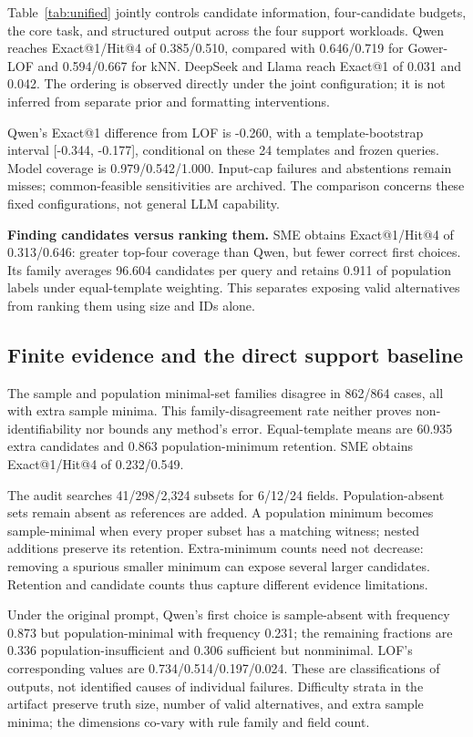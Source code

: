 \documentclass[conference]{IEEEtran}
\begin{document}
Table~\ref{tab:unified} jointly controls candidate information, four-candidate budgets, the core task, and structured output across the four support workloads. Qwen reaches Exact@1/Hit@4 of 0.385/0.510, compared with 0.646/0.719 for Gower-LOF and 0.594/0.667 for kNN. DeepSeek and Llama reach Exact@1 of 0.031 and 0.042. The ordering is observed directly under the joint configuration; it is not inferred from separate prior and formatting interventions.

Qwen's Exact@1 difference from LOF is -0.260, with a template-bootstrap interval [-0.344, -0.177], conditional on these 24 templates and frozen queries. Model coverage is 0.979/0.542/1.000. Input-cap failures and abstentions remain misses; common-feasible sensitivities are archived. The comparison concerns these fixed configurations, not general LLM capability.

\textbf{Finding candidates versus ranking them.} SME obtains Exact@1/Hit@4 of 0.313/0.646: greater top-four coverage than Qwen, but fewer correct first choices. Its family averages 96.604 candidates per query and retains 0.911 of population labels under equal-template weighting. This separates exposing valid alternatives from ranking them using size and IDs alone.

\subsection{Finite evidence and the direct support baseline}
The sample and population minimal-set families disagree in 862/864 cases, all with extra sample minima. This family-disagreement rate neither proves non-identifiability nor bounds any method's error. Equal-template means are 60.935 extra candidates and 0.863 population-minimum retention. SME obtains Exact@1/Hit@4 of 0.232/0.549.

The audit searches 41/298/2,324 subsets for 6/12/24 fields. Population-absent sets remain absent as references are added. A population minimum becomes sample-minimal when every proper subset has a matching witness; nested additions preserve its retention. Extra-minimum counts need not decrease: removing a spurious smaller minimum can expose several larger candidates. Retention and candidate counts thus capture different evidence limitations.

Under the original prompt, Qwen's first choice is sample-absent with frequency 0.873 but population-minimal with frequency 0.231; the remaining fractions are 0.336 population-insufficient and 0.306 sufficient but nonminimal. LOF's corresponding values are 0.734/0.514/0.197/0.024. These are classifications of outputs, not identified causes of individual failures. Difficulty strata in the artifact preserve truth size, number of valid alternatives, and extra sample minima; the dimensions co-vary with rule family and field count.
\end{document}
